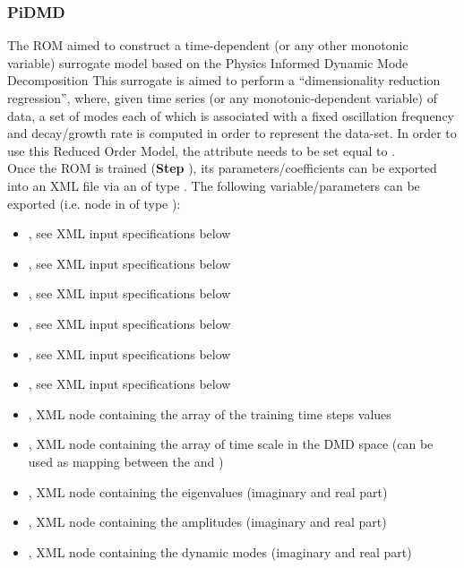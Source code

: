 \subsubsection{PiDMD}
  The  ROM aimed to construct a time-dependent (or any other monotonic
  variable) surrogate model based on the Physics Informed Dynamic Mode Decomposition     This
  surrogate is aimed to perform a ``dimensionality reduction regression'', where, given time
  series (or any monotonic-dependent variable) of data, a set of modes each of which is associated
  with a fixed oscillation frequency and decay/growth rate is computed     in order to represent the
  data-set.     In order to use this Reduced Order Model, the  attribute
   needs to be set equal to .     \\     Once the ROM  is trained
  (\textbf{Step} ), its parameters/coefficients can be exported into an XML file
  via an  of type . The following variable/parameters can be
  exported (i.e.  node     in  of type ):
  \begin{itemize}       \item {}, see XML input specifications below       \item
  , see XML input specifications below       \item {}, see XML input
  specifications below       \item {}, see XML input specifications below
  \item {}, see XML input specifications below       \item {}, see
  XML input specifications below       \item {}, XML node containing the array of
  the training time steps values       \item {}, XML node containing the array
  of time scale in the DMD space (can be used as mapping       between the   and
  )       \item {}, XML node containing the eigenvalues (imaginary
  and real part)       \item {}, XML node containing the amplitudes (imaginary and
  real part)       \item {}, XML node containing the dynamic modes (imaginary and real
  part)     \end{itemize}

